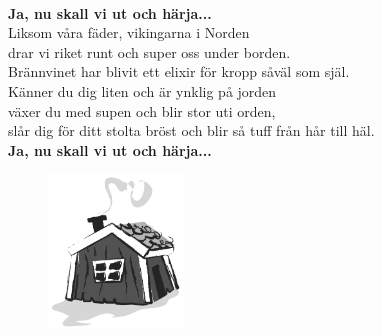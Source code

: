 \documentclass[a6paper, 10pt, twoside]{article}
\begin{document}
\begin{lyrics}
\vspace{5pt}\\
\textbf{Ja, nu skall vi ut och härja...} 
\vspace{5pt}\\
Liksom våra fäder, \physicalonly{\\}vikingarna i Norden\\
drar vi riket runt \physicalonly{\\}och super oss under borden.\\
Brännvinet har blivit \physicalonly{\\}ett elixir för kropp såväl som själ.
\vspace{5pt}\\
Känner du dig liten \physicalonly{\\}och är ynklig på jorden\\
växer du med supen \physicalonly{\\}och blir stor uti orden,\\
slår dig för ditt stolta bröst \physicalonly{\\}och blir så tuff från hår till häl. 
\vspace{5pt}\\
\textbf{Ja, nu skall vi ut och härja...}
\end{lyrics}
\vspace{-30pt}
\begin{figure}[!h]
\includegraphics[width=0.32\textwidth]{rodstuga.png}
\end{figure}
\end{document}
